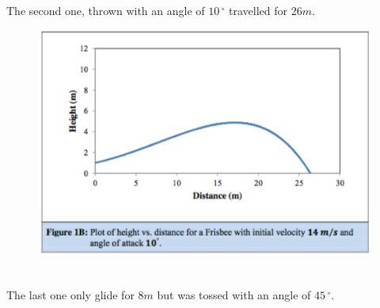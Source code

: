 \documentclass[10pt,a4paper]{report}
\begin{document}
\\The second one, thrown with an angle of $10\,^{\circ}$ travelled for $26m$.
\begin{figure}[h]
\centering
\includegraphics[scale=0.6]{graph2.jpg}
\end{figure}
\\The last one only glide for $8m$ but was tossed with an angle of $45\,^{\circ} $.
\end{document}
